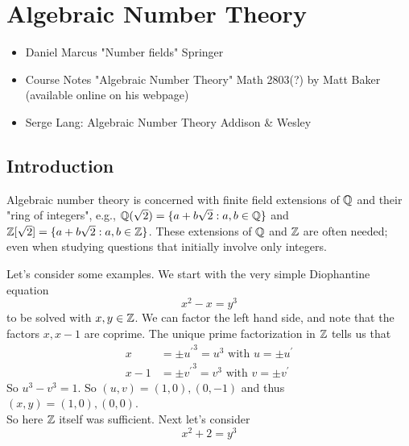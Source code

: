 \documentclass[NumTh.tex]{subfiles}
\begin{document}
\section{Algebraic Number Theory}

\begin{rem}[References]
  \begin{itemize}
    \item Daniel Marcus "Number fields" Springer
    \item Course Notes "Algebraic Number Theory" Math 2803(?) by Matt Baker (available online on his webpage)
    \item Serge Lang: Algebraic Number Theory Addison \& Wesley
  \end{itemize}
\end{rem}

\subsection{Introduction}

Algebraic number theory is concerned with finite field extensions of $\mathbb{Q}$ and their "ring of integers",
e.g., $\mathbb{Q}(\sqrt{2}) = \{a + b\sqrt{2}: a,b\in \mathbb{Q} \}$ and $\mathbb{Z}[\sqrt{2}] = \{ a + b \sqrt{2} : a,b \in \mathbb{Z} \}$.
These extensions of $\mathbb{Q}$ and $\mathbb{Z}$ are often needed; even when studying questions that initially involve only integers.

Let's consider some examples.
We start with the very simple Diophantine equation
\[ x^2 -x = y^3 \]
to be solved with $x,y \in \mathbb{Z}$.
We can factor the left hand side, and note that the factors $x, x-1$ are coprime.
The unique prime factorization in $\mathbb{Z}$ tells us that 
\begin{align*}
  x &= \pm {u^\prime}^3 = u^3 \text{ with } u = \pm u^\prime\\
  x -1 &= \pm {v^\prime}^3 = v^3 \text{ with } v = \pm v^\prime
\end{align*}
So $u^3 - v^3 = 1$.
So $(u,v) = (1,0), (0,-1)$ and thus $(x,y) = (1,0), (0,0)$.\\

So here $\mathbb{Z}$ itself was sufficient. Next let's consider
\[ x^2 + 2 = y^3 \]
\end{document}

